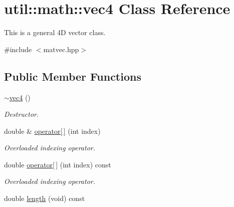 \hypertarget{classutil_1_1math_1_1vec4}{\section{util\-:\-:math\-:\-:vec4 \-Class \-Reference}
\label{classutil_1_1math_1_1vec4}
}


\-This is a general 4\-D vector class.  




{\ttfamily \#include $<$matvec.\-hpp$>$}

\subsection*{\-Public \-Member \-Functions}
\begin{DoxyCompactItemize}
\item 
\hypertarget{classutil_1_1math_1_1vec4_a7974f53606dba0bd78e9b3a02ed6672a}{\hyperlink{classutil_1_1math_1_1vec4_a7974f53606dba0bd78e9b3a02ed6672a}{$\sim$vec4} ()}\label{classutil_1_1math_1_1vec4_a7974f53606dba0bd78e9b3a02ed6672a}

\begin{DoxyCompactList}\small\item\em \-Destructor. \end{DoxyCompactList}\item 
\hypertarget{classutil_1_1math_1_1vec4_a853a08da5167e399da4fabc40fb099dd}{double \& \hyperlink{classutil_1_1math_1_1vec4_a853a08da5167e399da4fabc40fb099dd}{operator\mbox{[}$\,$\mbox{]}} (int index)}\label{classutil_1_1math_1_1vec4_a853a08da5167e399da4fabc40fb099dd}

\begin{DoxyCompactList}\small\item\em \-Overloaded indexing operator. \end{DoxyCompactList}\item 
\hypertarget{classutil_1_1math_1_1vec4_a983957f75390f03ede7c3145eea84e1c}{double \hyperlink{classutil_1_1math_1_1vec4_a983957f75390f03ede7c3145eea84e1c}{operator\mbox{[}$\,$\mbox{]}} (int index) const }\label{classutil_1_1math_1_1vec4_a983957f75390f03ede7c3145eea84e1c}

\begin{DoxyCompactList}\small\item\em \-Overloaded indexing operator. \end{DoxyCompactList}\item 
\hypertarget{classutil_1_1math_1_1vec4_a77dd8b49b1ebb4f140a0c0f490307712}{double \hyperlink{classutil_1_1math_1_1vec4_a77dd8b49b1ebb4f140a0c0f490307712}{length} (void) const }\label{classutil_1_1math_1_1vec4_a77dd8b49b1ebb4f140a0c0f490307712}


\end{DoxyCompactItemize}
